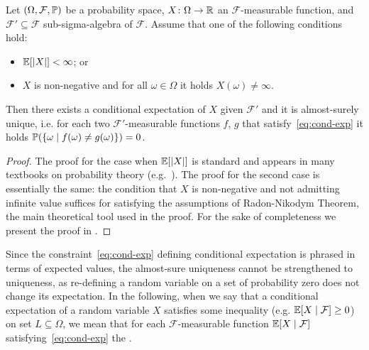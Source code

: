 \begin{proposition}
\label{prop:conditional-exp-existence}
Let $(\Omega,\mathcal{F},\mathbb{P})$ be a probability space, 
$X\colon\Omega\rightarrow 
\mathbb{R}$ an $\mathcal{F}$-measurable function, and $\mathcal{F}'\subseteq 
\mathcal{F}$ sub-sigma-algebra of $\mathcal{F}$. Assume that one of the following conditions hold:
\begin{itemize}
\item $\mathbb{E}[|X|]<\infty$; or
\item $X$ is non-negative and for all $\omega\in\Omega$ it holds $X(\omega)\neq \infty$.
\end{itemize}
Then there exists a conditional expectation of $X$ given $\mathcal{F}'$ and it is almost-surely unique, i.e. for each two $\mathcal{F}'$-measurable functions $f$, $g$ that satisfy~\eqref{eq:cond-exp} it holds $\mathbb{P}(\{\omega\mid f(\omega)\neq g(\omega)\})=0$.
\end{proposition}
\begin{proof}
The proof for the case when $\mathbb{E}[|X|]$ is standard and appears in many textbooks on probability theory (e.g.~\cite{Billingsley:book,Ash:book,Rosenthal:book}). The proof for the second case is essentially the same: the condition that $X$ is non-negative and not admitting infinite value suffices for satisfying the assumptions of Radon-Nikodym Theorem, the main theoretical tool used in the proof. For the sake of completeness we present the proof in \AppendixMaterial.
\end{proof}

Since the constraint~\eqref{eq:cond-exp} defining conditional expectation is phrased in terms of expected values, the almost-sure uniqueness cannot be strengthened to uniqueness, as re-defining a random variable on a set of probability zero does not change its expectation. In the following, when we say that a conditional expectation of a random variable $X$ satisfies some inequality (e.g. $\mathbb{E}[X\mid\mathcal{F}]\geq 0$) on set $L\subseteq \Omega$, we mean that for each $\mathcal{F}$-measurable function $\mathbb{E}[X\mid\mathcal{F}]$ satisfying~\eqref{eq:cond-exp} the .

